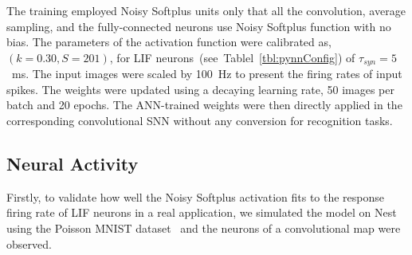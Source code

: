 	The training employed Noisy Softplus units only that all the convolution, average sampling, and the fully-connected neurons use Noisy Softplus function with no bias.
	The parameters of the activation function were calibrated as, $(k=0.30, S=201)$,  for LIF neurons~(see~Tablel~\ref{tbl:pynnConfig}) of $\tau_{syn}=5$~ms.
	The input images were scaled by 100~Hz to present the firing rates of input spikes.
	The weights were updated using a decaying learning rate, 50 images per batch and 20 epochs.
	The ANN-trained weights were then directly applied in the corresponding convolutional SNN without any conversion for recognition tasks.
	
	
	\subsection{Neural Activity}
	Firstly, to validate how well the Noisy Softplus activation fits to the response firing rate of LIF neurons in a real application, we simulated the model on Nest using the Poisson MNIST dataset~\cite{liu2016bench} and the neurons of a convolutional map were observed.
	
